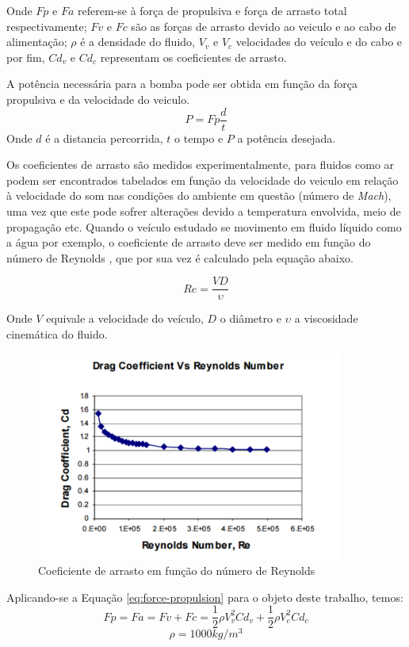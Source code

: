 Onde $Fp$ e $Fa$ referem-se à força de propulsiva e força de arrasto total
respectivamente; $Fv$ e $Fc$ são as forças de arrasto devido ao veiculo e ao cabo de
alimentação; $\rho$ é a densidade do fluido, $V_{v}$ e $V_{c}$ velocidades do
veículo e do cabo e por fim, $Cd_{v}$ e $Cd_{c}$ representam os coeficientes
de arrasto.
\par
A potência necessária para a bomba pode ser obtida em função da força propulsiva
e da velocidade do veiculo.
\begin{equation} \label{eq:force-propulsiva}
  P = Fp\frac{d}{t}
\end{equation}
Onde $d$ é a distancia percorrida, $t$ o tempo e $P$ a potência desejada.
\par
Os coeficientes de arrasto são medidos experimentalmente, para fluidos como
ar podem ser encontrados tabelados em função da velocidade do veiculo em relação
à velocidade do som nas condições do ambiente em questão (número de \textit{Mach}), uma
vez que este pode sofrer alterações devido a temperatura envolvida, meio de
propagação etc. Quando o veículo estudado se movimento em fluido líquido como a
água por exemplo, o coeficiente de arrasto deve ser medido em função do número
de Reynolds \cite{eng2008}, que por sua vez é calculado pela equação abaixo.

\begin{equation} \label{eq:reynolds}
  Re = \frac{VD}{\upsilon}
\end{equation}

Onde $V$ equivale a velocidade do veículo, $D$ o diâmetro e $\upsilon$ a viscosidade
cinemática do fluido.
\par
\begin{figure}[h]
  \centering
  \includegraphics[width=0.9\textwidth]{figures/graphic-reynolds.png}
  \caption{Coeficiente de arrasto em função do número de Reynolds \cite{eng2008}}
  \label{fig:graphic-reynolds}
\end{figure}
\FloatBarrier
\par
Aplicando-se a Equação \ref{eq:force-propulsion} para o objeto deste trabalho, temos:
\begin{displaymath}
  Fp = Fa = Fv + Fc = \frac{1}{2}\rho V^{2}_{v}Cd_{v} + \frac{1}{2}\rho V^{2}_{c}Cd_{c}
\end{displaymath}
\begin{displaymath}
  \rho = 1000 kg/m^{3}
\end{displaymath}

